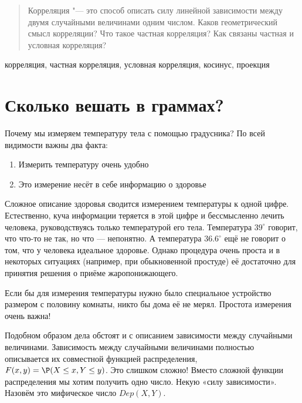 \documentclass[10pt]{article}
\begin{document}


\DoFirstPageTechnicalStuff


\newtheorem{theorem}{Теорема}
\newtheorem{definition}{Определение}


\begin{abstract}
Корреляция "--- это способ описать силу линейной зависимости между двумя случайными величинами одним числом. Каков геометрический смысл корреляции? Что такое частная корреляция? Как связаны частная и условная корреляция? 
\end{abstract}

\begin{keyword}
корреляция, частная корреляция, условная корреляция, косинус, проекция
\end{keyword}


\section{Сколько вешать в граммах?}


Почему мы измеряем температуру тела с помощью градусника? По всей видимости важны два факта:

\begin{enumerate}
\item Измерить температуру очень удобно
\item Это измерение несёт в себе информацию о здоровье
\end{enumerate}

Сложное описание здоровья сводится измерением температуры к одной цифре. Естественно, куча информации теряется в этой цифре и бессмысленно лечить человека, руководствуясь только температурой его тела. Температура $39^{\circ}$ говорит, что что-то не так, но что --- непонятно. А температура $36.6^{\circ}$ ещё не говорит о том, что у человека идеальное здоровье. Однако процедура очень проста и в некоторых ситуациях (например, при обыкновенной простуде) её достаточно для принятия решения о приёме жаропонижающего.

Если бы для измерения температуры нужно было специальное устройство размером с половину комнаты, никто бы дома её не мерял. Простота измерения очень важна!

Подобном образом дела обстоят и с описанием зависимости между случайными величинами. Зависимость между случайными величинами полностью описывается их совместной функцией распределения, $F(x,y)=\P(X\leq x, Y\leq y)$. Это слишком сложно! Вместо сложной функции распределения мы хотим получить одно число. Некую «силу зависимости». Назовём это мифическое число $Dep(X,Y)$. 
\end{document}

